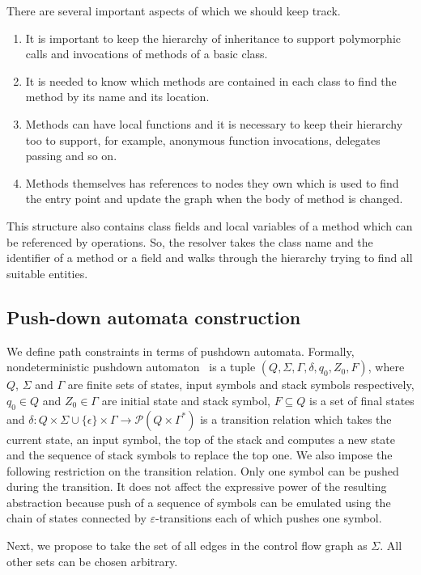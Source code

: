 There are several important aspects of which we should keep track. 
\begin{enumerate}
 \item It is important to keep the hierarchy of inheritance to support polymorphic calls and invocations of methods of a basic class.
 \item It is needed to know which methods are contained in each class to find the method by its name and its location.
 \item Methods can have local functions and it is necessary to keep their hierarchy too to support, for example, anonymous function invocations, delegates passing and so on.
 \item Methods themselves has references to nodes they own which is used to find the entry point and update the graph when the body of method is changed.
\end{enumerate}
This structure also contains class fields and local variables of a method which can be referenced by operations.
So, the resolver takes the class name and the identifier of a method or a field and walks through the hierarchy trying to find all suitable entities.

\subsection{Push-down automata construction}

We define path constraints in terms of pushdown automata.
Formally, nondeterministic pushdown automaton~\cite{AutomataTheory} is a tuple $(Q, \Sigma, \Gamma, \delta, q_0, Z_0, F)$, where $Q$, $\Sigma$ and $\Gamma$ are finite sets of states, input symbols and stack symbols respectively, $q_0 \in Q$ and $Z_0 \in \Gamma$ are initial state and stack symbol, $F \subseteq Q$ is a set of final states and $\delta: Q \times \Sigma \cup \{\epsilon\} \times \Gamma \rightarrow \mathcal P (Q \times \Gamma^*)$ is a transition relation which takes the current state, an input symbol, the top of the stack and computes a new state and the sequence of stack symbols to replace the top one.
We also impose the following restriction on the transition relation.
Only one symbol can be pushed during the transition.
It does not affect the expressive power of the resulting abstraction because push of a sequence of symbols can be emulated using the chain of states connected by $\varepsilon$-transitions each of which pushes one symbol.

Next, we propose to take the set of all edges in the control flow graph as $\Sigma$.
All other sets can be chosen arbitrary.

